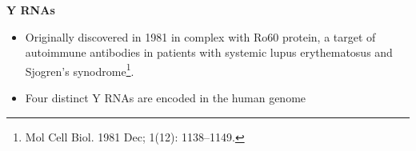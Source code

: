 \documentclass[landscape]{slides}
\begin{document}
\begin{slide}
\begin{center}
\textbf{Y RNAs}

\small
\begin{itemize}
\item Originally discovered in 1981 in complex with Ro60 protein, a target of 
  autoimmune antibodies in patients with systemic lupus erythematosus
  and Sjogren's synodrome\footnote{Mol Cell Biol. 1981 Dec; 1(12): 1138–1149.}. 
\item Four distinct Y RNAs are encoded in the human genome
\end{itemize}


\end{center}
\vfill
\end{slide}
\end{document}
